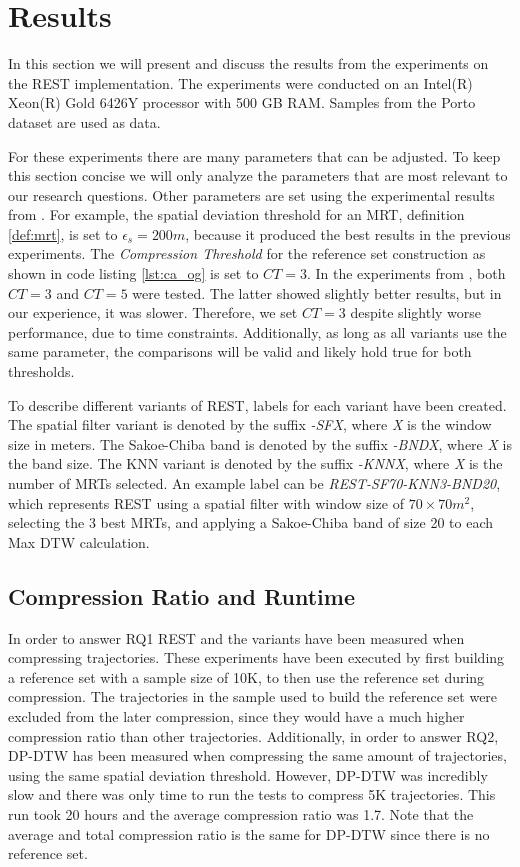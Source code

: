 \chapter{Results}
\label{chap:res}
In this section we will present and discuss the results from the experiments on the REST implementation. The experiments were conducted on an Intel(R) Xeon(R) Gold 6426Y processor with 500 GB RAM. Samples from the Porto dataset are used as data.

For these experiments there are many parameters that can be adjusted. To keep this section concise we will only analyze the parameters that are most relevant to our research questions. Other parameters are set using the experimental results from \textcite{zhao2018rest}. For example, the spatial deviation threshold for an MRT, definition \ref{def:mrt}, is set to $\epsilon_s = 200 m$, because it produced the best results in the previous experiments. The \textit{Compression Threshold} for the reference set construction as shown in code listing \ref{lst:ca_og} is set to $CT = 3$. In the experiments from \textcite{zhao2018rest}, both $CT =3$ and $CT = 5$ were tested. The latter showed slightly better results, but in our experience, it was slower. Therefore, we set $CT = 3$ despite slightly worse performance, due to time constraints. Additionally, as long as all variants use the same parameter, the comparisons will be valid and likely hold true for both thresholds.

To describe different variants of REST, labels for each variant have been created. The spatial filter variant is denoted by the suffix \textit{-SFX}, where \textit{X} is the window size in meters. The Sakoe-Chiba band is denoted by the suffix \textit{-BNDX}, where \textit{X} is the band size. The KNN variant is denoted by the suffix \textit{-KNNX}, where \textit{X} is the number of MRTs selected. An example label can be \textit{REST-SF70-KNN3-BND20}, which represents REST using a spatial filter with window size of $70\times70 m^2$, selecting the 3 best MRTs, and applying a Sakoe-Chiba band of size 20 to each Max DTW calculation.

\section{Compression Ratio and Runtime}
In order to answer RQ1 REST and the variants have been measured when compressing trajectories. These experiments have been executed by first building a reference set with a sample size of 10K, to then use the reference set during compression. The trajectories in the sample used to build the reference set were excluded from the later compression, since they would have a much higher compression ratio than other trajectories. Additionally, in order to answer RQ2, DP-DTW has been measured when compressing the same amount of trajectories, using the same spatial deviation threshold. However, DP-DTW was incredibly slow and there was only time to run the tests to compress 5K trajectories. This run took 20 hours and the average compression ratio was 1.7. Note that the average and total compression ratio is the same for DP-DTW since there is no reference set.

